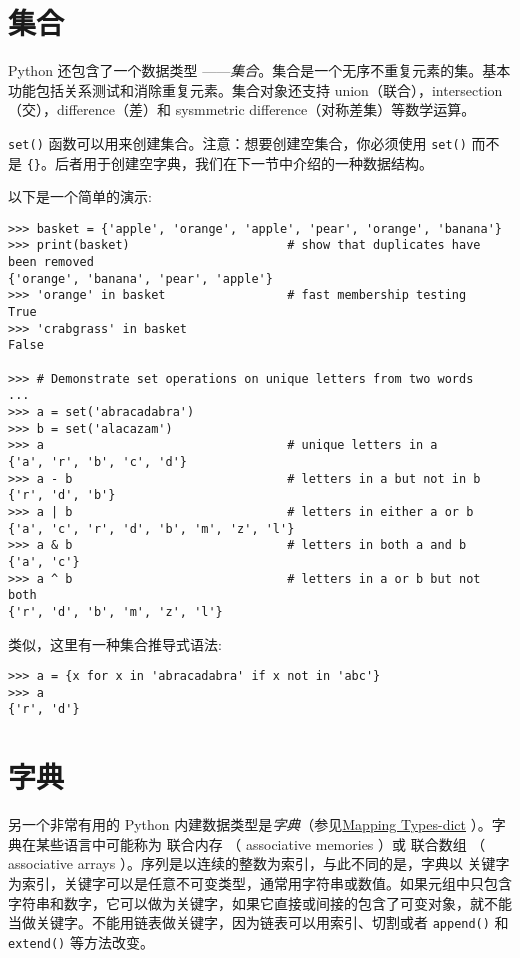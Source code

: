 \section{集合}
Python 还包含了一个数据类型 ——\emph{集合}。集合是一个无序不重复元素的集。基本功能包括关系测试和消除重复元素。集合对象还支持 union（联合），intersection（交），difference（差）和 sysmmetric difference（对称差集）等数学运算。

\texttt{set()} 函数可以用来创建集合。注意：想要创建空集合，你必须使用 \texttt{set()} 而不是 \texttt{\{\}}。后者用于创建空字典，我们在下一节中介绍的一种数据结构。

以下是一个简单的演示:
\begin{lstlisting}
>>> basket = {'apple', 'orange', 'apple', 'pear', 'orange', 'banana'}
>>> print(basket)                      # show that duplicates have been removed
{'orange', 'banana', 'pear', 'apple'}
>>> 'orange' in basket                 # fast membership testing
True
>>> 'crabgrass' in basket
False

>>> # Demonstrate set operations on unique letters from two words
...
>>> a = set('abracadabra')
>>> b = set('alacazam')
>>> a                                  # unique letters in a
{'a', 'r', 'b', 'c', 'd'}
>>> a - b                              # letters in a but not in b
{'r', 'd', 'b'}
>>> a | b                              # letters in either a or b
{'a', 'c', 'r', 'd', 'b', 'm', 'z', 'l'}
>>> a & b                              # letters in both a and b
{'a', 'c'}
>>> a ^ b                              # letters in a or b but not both
{'r', 'd', 'b', 'm', 'z', 'l'}
\end{lstlisting}
类似，这里有一种集合推导式语法:
\begin{lstlisting}
>>> a = {x for x in 'abracadabra' if x not in 'abc'}
>>> a
{'r', 'd'}
\end{lstlisting}
\section{字典}
另一个非常有用的 Python 内建数据类型是\emph{字典}（参见\href{https://docs.python.org/3/library/stdtypes.html#mapping-types-dict}{Mapping Types-dict} ）。字典在某些语言中可能称为 联合内存 （ associative memories ）或 联合数组 （ associative arrays ）。序列是以连续的整数为索引，与此不同的是，字典以 关键字 为索引，关键字可以是任意不可变类型，通常用字符串或数值。如果元组中只包含字符串和数字，它可以做为关键字，如果它直接或间接的包含了可变对象，就不能当做关键字。不能用链表做关键字，因为链表可以用索引、切割或者 \texttt{append()} 和\texttt{extend()} 等方法改变。

